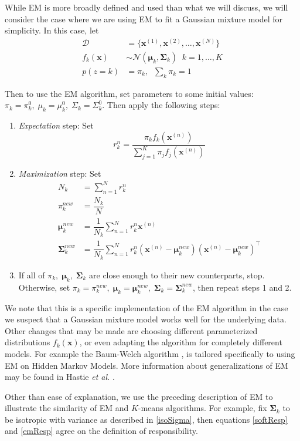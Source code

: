 While EM is more broadly defined and used than what we will discuss, we will consider the case where we are using EM to fit a Gaussian mixture model for simplicity.  In this case, let 
\begin{align}
	\mathcal{D} &= \{\bm x^{(1)},\bm x^{(2)},\ldots,\bm x^{(N)}\} \nonumber \\
	f_k(\bm x) &\sim \mathcal{N}(\bm \mu_k,\bm \Sigma_k)\;\; k=1,\ldots,K\\
	 p(z=k) &=\pi_{k},   \;\; \sum_{k} \pi_{k} = 1	
\end{align}

Then to use the EM algorithm, set parameters to some initial values: \( \pi_{k}=\pi_{k}^0,\; \mu_{k}=\mu_{k}^0,\; \Sigma_{k}=\Sigma_{k}^0\). Then apply the following steps:
\begin{enumerate}
	\item \textit{Expectation} step: Set 
		\begin{equation}\label{emResp}
		 r_k^n = \frac{\pi_k f_k(\bm x^{(n)})}{\sum_{j=1}^K \pi_j f_j(\bm x^{(n)})}
		\end{equation}
	\item \textit{Maximization} step: Set
	\begin{align}
		N_k &= \sum_{n=1}^{N}r_k^{n}\\
		\pi_k^{new} &= \dfrac{N_k}{N}\\
		\bm \mu_{k}^{new} &= \dfrac{1}{N_k}\sum_{n=1}^{N} r_k^{n}\bm x^{(n)}\\
		\bm \Sigma_k^{new} &= \dfrac{1}{N_k}\sum_{n=1}^{N}r_k^{n} (\bm x^{(n)}-\bm \mu_{k}^{new})(\bm x^{(n)}-\bm \mu_{k}^{new})^{\intercal}
	\end{align}
	\item If all of \( \pi_k, \;\bm\mu_k,\;\bm\Sigma_k \) are close enough to their new counterparts, stop.  Otherwise, set \( \pi_k = \pi_k^{new}, \;\bm\mu_k = \bm\mu_{k}^{new}, \;\bm\Sigma_k = \bm\Sigma_k^{new}\), then repeat steps 1 and 2.
\end{enumerate}

We note that this is a specific implementation of the EM algorithm in the case we suspect that a Gaussian mixture model works well for the underlying data.  Other changes that may be made are choosing different parameterized distributions \( f_k(\bm x) \), or even adapting the algorithm for completely different models. For example the Baum-Welch algorithm \cite{baum1970}, is tailored  specifically to using EM on Hidden Markov Models. More information about generalizations of EM may be found in Hastie \textit{et al.} \citep[p.276]{hastie09esl}.

Other than ease of explanation, we use the preceding description of EM to illustrate the similarity of EM and \( K \)-means algorithms.  For example, fix \( \bm\Sigma_{k} \) to be isotropic with variance as described in \ref{isoSigma}, then equations \ref{softResp} and \ref{emResp} agree on the definition of responsibility.  %